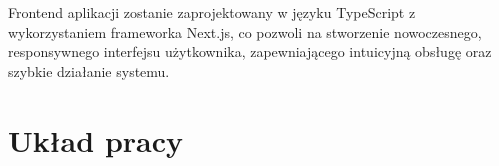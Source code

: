 Frontend aplikacji zostanie zaprojektowany w języku TypeScript z wykorzystaniem frameworka Next.js, co pozwoli na stworzenie nowoczesnego, responsywnego interfejsu użytkownika, zapewniającego intuicyjną obsługę oraz szybkie działanie systemu.

\section{Układ pracy}
